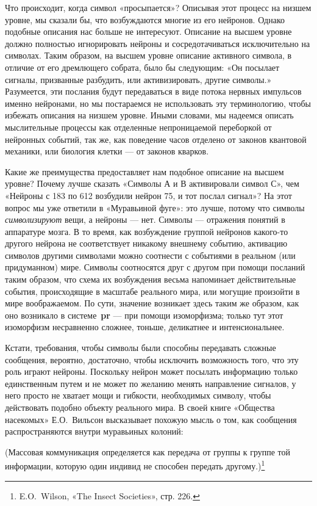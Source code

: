 \documentclass[../main.tex]{subfiles}
\begin{document}
Что происходит, когда символ «просыпается»? Описывая этот процесс на низшем уровне, мы сказали бы, что возбуждаются многие из его нейронов. Однако подобные описания нас больше не интересуют. Описание на высшем уровне должно полностью игнорировать нейроны и сосредотачиваться исключительно на символах. Таким образом, на высшем уровне описание активного символа, в отличие от его дремлющего собрата, было бы следующим: «Он посылает сигналы, призванные разбудить, или активизировать, другие символы.» Разумеется, эти послания будут передаваться в виде потока нервных импульсов именно нейронами, но мы постараемся не использовать эту терминологию, чтобы избежать описания на низшем уровне. Иными словами, мы надеемся описать мыслительные процессы как отделенные непроницаемой переборкой от нейронных событий, так же, как поведение часов отделено от законов квантовой механики, или биология клетки --- от законов кварков.

Какие же преимущества предоставляет нам подобное описание на высшем уровне? Почему лучше сказать «Символы А и В активировали символ С», чем «Нейроны с 183 по 612 возбудили нейрон 75, и тот послал сигнал»? На этот вопрос мы уже ответили в «Муравьиной фуге»: это лучше, потому что символы \emph{символизируют} вещи, а нейроны --- нет. Символы --- отражения понятий в аппаратуре мозга. В то время, как возбуждение группой нейронов какого-то другого нейрона не соответствует никакому внешнему событию, активацию символов другими символами можно соотнести с событиями в реальном (или придуманном) мире. Символы соотносятся друг с другом при помощи посланий таким образом, что схема их возбуждения весьма напоминает действительные события, происходящие в масштабе реального мира, или могущие произойти в мире воображаемом. По сути, значение возникает здесь таким же образом, как оно возникало в системе~\textbf{pr} --- при помощи изоморфизма; только тут этот изоморфизм несравненно сложнее, тоньше, деликатнее и интенсиональнее.

Кстати, требования, чтобы символы были способны передавать сложные сообщения, вероятно, достаточно, чтобы исключить возможность того, что эту роль играют нейроны. Поскольку нейрон может посылать информацию только единственным путем и не может по желанию менять направление сигналов, у него просто не хватает мощи и гибкости, необходимых символу, чтобы действовать подобно объекту реального мира. В своей книге «Общества насекомых» Е.О.~Вильсон высказывает похожую мысль о том, как сообщения распространяются внутри муравьиных колоний:

(Массовая коммуникация определяется как передача от группы к группе той информации, которую один индивид не способен передать другому.)\footnote{E.O.~Wilson, «The Insect Societies», стр. 226.}
\end{document}
